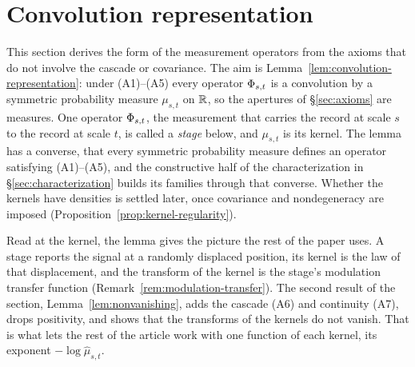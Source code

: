 %

\section{Convolution representation}\label{sec:representation}

This section derives the form of the measurement operators from the axioms that do not
involve the cascade or covariance. The aim is Lemma~\ref{lem:convolution-representation}:
under (A1)--(A5) every operator $\Phi_{s,t}$ is a convolution by a symmetric probability
measure $\mu_{s,t}$ on $\mathbb{R}$, so the apertures of \S\ref{sec:axioms} are measures. One
operator $\Phi_{s,t}$, the measurement that carries the record at scale $s$ to the record
at scale $t$, is called a \emph{stage} below, and $\mu_{s,t}$ is its kernel. The lemma has
a converse, that every symmetric probability measure defines an operator satisfying
(A1)--(A5), and the constructive half of the characterization in
\S\ref{sec:characterization} builds its families through that converse. Whether the kernels
have densities is settled later, once covariance and nondegeneracy are imposed
(Proposition~\ref{prop:kernel-regularity}).

Read at the kernel, the lemma gives the picture the rest of the paper uses. A stage
reports the signal at a randomly displaced position, its kernel is the law of that
displacement, and the transform of the kernel is the stage's modulation transfer function
(Remark~\ref{rem:modulation-transfer}). The second result of the section,
Lemma~\ref{lem:nonvanishing}, adds the cascade (A6) and continuity (A7), drops positivity,
and shows that the transforms of the kernels do not vanish. That is what lets the rest of
the article work with one function of each kernel, its exponent $-\log\hat\mu_{s,t}$.

